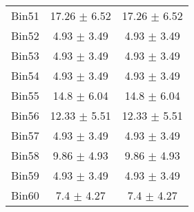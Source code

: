 \begin{tabular}{|c|c|c|}
     Bin51 & 17.26 $\pm$ 6.52 & 17.26 $\pm$ 6.52 \\ \cline{1-3} 
     Bin52 & 4.93 $\pm$ 3.49 & 4.93 $\pm$ 3.49 \\ \cline{1-3} 
     Bin53 & 4.93 $\pm$ 3.49 & 4.93 $\pm$ 3.49 \\ \cline{1-3} 
     Bin54 & 4.93 $\pm$ 3.49 & 4.93 $\pm$ 3.49 \\ \cline{1-3} 
     Bin55 & 14.8 $\pm$ 6.04 & 14.8 $\pm$ 6.04 \\ \cline{1-3} 
     Bin56 & 12.33 $\pm$ 5.51 & 12.33 $\pm$ 5.51 \\ \cline{1-3} 
     Bin57 & 4.93 $\pm$ 3.49 & 4.93 $\pm$ 3.49 \\ \cline{1-3} 
     Bin58 & 9.86 $\pm$ 4.93 & 9.86 $\pm$ 4.93 \\ \cline{1-3} 
     Bin59 & 4.93 $\pm$ 3.49 & 4.93 $\pm$ 3.49 \\ \cline{1-3} 
     Bin60 & 7.4 $\pm$ 4.27 & 7.4 $\pm$ 4.27 \\ \cline{1-3} 
  \end{tabular}
